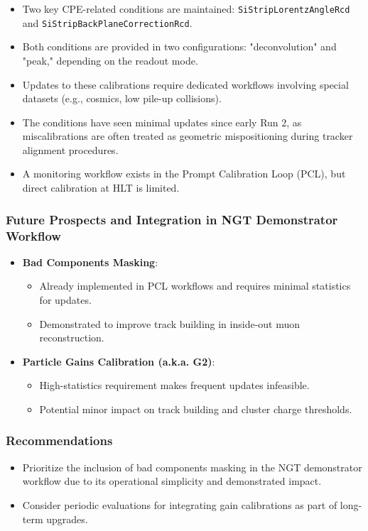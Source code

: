 \begin{itemize}
    \item Two key CPE-related conditions are maintained:\newline
    \texttt{SiStripLorentzAngleRcd} and \texttt{SiStripBackPlaneCorrectionRcd}.
    \item Both conditions are provided in two configurations: "deconvolution" and "peak," depending on the readout mode.
    \item Updates to these calibrations require dedicated workflows involving special datasets (e.g., cosmics, low pile-up collisions).
    \item The conditions have seen minimal updates since early Run 2, as miscalibrations are often treated as geometric mispositioning during tracker alignment procedures.
    \item A monitoring workflow exists in the Prompt Calibration Loop (PCL), but direct calibration at HLT is limited.
\end{itemize}

\subsubsection*{Future Prospects and Integration in NGT Demonstrator Workflow}
\begin{itemize}
    \item \textbf{Bad Components Masking}:
    \begin{itemize}
        \item Already implemented in PCL workflows and requires minimal statistics for updates.
        \item Demonstrated to improve track building in inside-out muon reconstruction.
    \end{itemize}
    \item \textbf{Particle Gains Calibration (a.k.a. G2)}:
    \begin{itemize}
        \item High-statistics requirement makes frequent updates infeasible.
        \item Potential minor impact on track building and cluster charge thresholds.
    \end{itemize}
\end{itemize}

\subsubsection*{Recommendations}
\begin{itemize}
    \item Prioritize the inclusion of bad components masking in the NGT demonstrator workflow due to its operational simplicity and demonstrated impact.
    \item Consider periodic evaluations for integrating gain calibrations as part of long-term upgrades.
\end{itemize}
